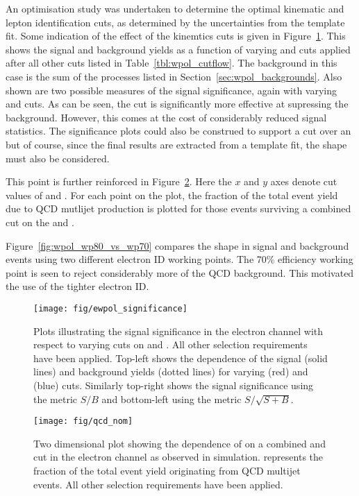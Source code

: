 An optimisation study was undertaken to determine the optimal kinematic and
lepton identification cuts, as determined by the uncertainties from the template
fit. Some indication of the effect of the kinemtics cuts is given in
Figure~\ref{fig:wpol_ele_significance}. This shows the signal and background
yields as a function of varying \MET and \MT cuts applied after all other cuts
listed in Table~\ref{tbl:wpol_cutflow}. The background in this case is the sum
of the processes listed in Section~\ref{sec:wpol_backgrounds}. Also shown are
two possible measures of the signal significance, again with varying \MET and
\MT cuts. As can be seen, the \MET cut is significantly more effective at
supressing the background. However, this comes at the cost of considerably
reduced signal statistics. The significance plots could also be construed to
support a \MET cut over an \MT but of course, since the final results are
extracted from a template fit, the \LP shape must also be considered.

This point is further reinforced in Figure~\ref{fig:wpol_met_mt_fqcd}. Here the
$x$ and $y$ axes denote cut values of \MET and \MT. For each point on the plot,
the fraction of the total event yield due to \ac{QCD} mutlijet production is
plotted for those events surviving a combined cut on the \MET and \MT.

Figure~\ref{fig:wpol_wp80_vs_wp70} compares the \LP shape in signal and
background events using two different electron ID working points. The 70\%
efficiency working point is seen to reject considerably more of the \ac{QCD}
background. This motivated the use of the tighter electron ID.

\begin{figure}
\texttt{[image: fig/ewpol\_significance]}
\caption[Plots illustrating the signal significance in the electron channel with
respect to varying cuts on \MET and \MT.]{Plots illustrating the signal
  significance in the electron channel with respect to varying cuts on \MET and
  \MT. All other selection requirements have been applied. Top-left shows the
  dependence of the signal (solid lines) and background yields (dotted lines)
  for varying \MET (red) and \MT (blue) cuts. Similarly top-right shows the
  signal significance using the metric $S/B$ and bottom-left using the metric
  $S/\sqrt{S+B}$.}
\label{fig:wpol_ele_significance}
\end{figure}

\begin{figure}
\texttt{[image: fig/qcd\_nom]}
\caption{Two dimensional plot showing the dependence of \fQCD on a combined \MET
  and \MT cut in the electron channel as observed in simulation. \fQCD
  represents the fraction of the total event yield originating from \ac{QCD}
  multijet events. All other selection requirements have been applied. }
\label{fig:wpol_met_mt_fqcd}
\end{figure}

